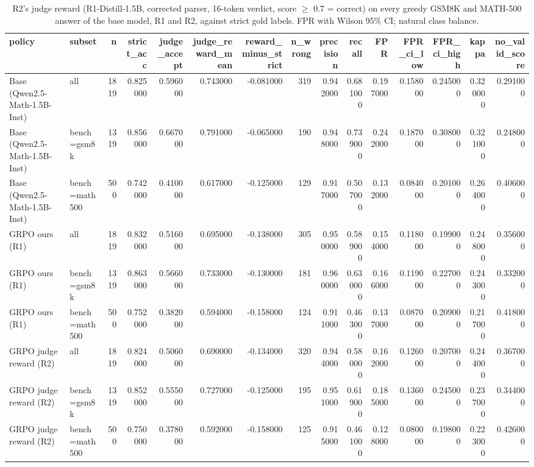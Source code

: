 \begin{table}
\caption{R2's judge reward (R1-Distill-1.5B, corrected parser, 16-token verdict, score $\geq$ 0.7 = correct) on every greedy GSM8K and MATH-500 answer of the base model, R1 and R2, against strict gold labels. FPR with Wilson 95\% CI; natural class balance.}
\label{tab:judge_onpolicy}
\begin{tabular}{llrrrrrrrrrrrrr}
\toprule
policy & subset & n & strict_acc & judge_accept & judge_reward_mean & reward_minus_strict & n_wrong & precision & recall & FPR & FPR_ci_low & FPR_ci_high & kappa & no_valid_score \\
\midrule
Base (Qwen2.5-Math-1.5B-Inst) & all & 1819 & 0.825000 & 0.596000 & 0.743000 & -0.081000 & 319 & 0.942000 & 0.681000 & 0.197000 & 0.158000 & 0.245000 & 0.320000 & 0.291000 \\
Base (Qwen2.5-Math-1.5B-Inst) & bench=gsm8k & 1319 & 0.856000 & 0.667000 & 0.791000 & -0.065000 & 190 & 0.948000 & 0.739000 & 0.242000 & 0.187000 & 0.308000 & 0.321000 & 0.248000 \\
Base (Qwen2.5-Math-1.5B-Inst) & bench=math500 & 500 & 0.742000 & 0.410000 & 0.617000 & -0.125000 & 129 & 0.917000 & 0.507000 & 0.132000 & 0.084000 & 0.201000 & 0.264000 & 0.406000 \\
GRPO ours (R1) & all & 1819 & 0.832000 & 0.516000 & 0.695000 & -0.138000 & 305 & 0.950000 & 0.589000 & 0.154000 & 0.118000 & 0.199000 & 0.248000 & 0.356000 \\
GRPO ours (R1) & bench=gsm8k & 1319 & 0.863000 & 0.566000 & 0.733000 & -0.130000 & 181 & 0.960000 & 0.630000 & 0.166000 & 0.119000 & 0.227000 & 0.243000 & 0.332000 \\
GRPO ours (R1) & bench=math500 & 500 & 0.752000 & 0.382000 & 0.594000 & -0.158000 & 124 & 0.911000 & 0.463000 & 0.137000 & 0.087000 & 0.209000 & 0.217000 & 0.418000 \\
GRPO judge reward (R2) & all & 1819 & 0.824000 & 0.506000 & 0.690000 & -0.134000 & 320 & 0.944000 & 0.580000 & 0.162000 & 0.126000 & 0.207000 & 0.244000 & 0.367000 \\
GRPO judge reward (R2) & bench=gsm8k & 1319 & 0.852000 & 0.555000 & 0.727000 & -0.125000 & 195 & 0.951000 & 0.619000 & 0.185000 & 0.136000 & 0.245000 & 0.237000 & 0.344000 \\
GRPO judge reward (R2) & bench=math500 & 500 & 0.750000 & 0.378000 & 0.592000 & -0.158000 & 125 & 0.915000 & 0.461000 & 0.128000 & 0.080000 & 0.198000 & 0.223000 & 0.426000 \\
\bottomrule
\end{tabular}
\end{table}

